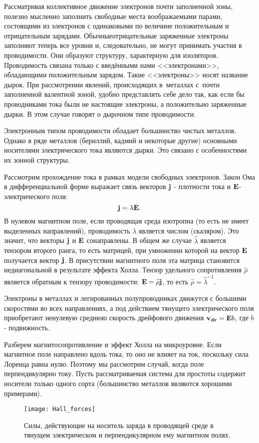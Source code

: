 Рассматривая коллективное движение электронов почти заполненной зоны, полезно мысленно заполнить свободные места
воображаемыми парами, состоящими из электронов с одинаковыми по величине положительным и отрицательным зарядами. Обычныеотрицательные заряженные электроны заполняют теперь все уровни и, следовательно, не могут принимать участия в проводимости. Они образуют структуру, характерную для изоляторов. Проводимость связана только с введёнными нами
<<электронами>>, обладающими положительным зарядом. Такие <<электроны>> носят название \textsf{дырок}. При рассмотрении явлений, происходящих в~металлах с~почти заполненной валентной зоной, удобно представлять себе дело так, как если бы проводниками тока были не настоящие электроны, а положительно заряженные дырки. В этом случае говорят о \textsf{дырочном типе проводимости}.

Электронным типом проводимости обладает большинство чистых металлов. Однако в ряде металлов (бериллий, кадмий и
некоторые другие) основными носителями электрического тока являются дырки. Это связано с особенностями их зонной
структуры.

Рассмотрим прохождение тока в рамках модели свободных электронов.
Закон Ома в дифференциальной форме выражает связь векторов ${\bf j}$ - плотности тока и ${\bf E}$- электрического поля:
\begin{equation}
{\bf j}=\lambda {\bf E}.
\end{equation}
 В нулевом магнитном поле, если проводящая среда изотропна (то есть не имеет выделенных направлений), проводимость $\lambda$ является числом (скаляром). Это значит, что векторы ${\bf j}$ и ${\bf E}$ сонаправлены. В общем же случае $\widehat{\lambda}$ является тензором второго ранга, то есть матрицей, при умножении которой на вектор ${\bf E}$ получается вектор ${\bf j}$. В присутствии магнитного поля эта матрица становится недиагональной в результате эффекта Холла. Тензор удельного сопротивления $\widehat{\rho}$ является обратным к тензору проводимости: ${\bf E}=\widehat{\rho} {\bf j}$, то есть $\widehat{\rho}=\widehat{\lambda}^{-1}$.

Электроны в металлах и легированных полупроводниках движутся с большими скоростями во всех направлениях, а под действием тянущего
электрического поля приобретают ненулевую среднюю скорость дрейфового движения ${\bf v_{dr}}= {\bf E}b$, где $b$ - подвижность.

Разберем магнитосопротивление и эффект Холла на микроуровне. Если магнитное поле направлено вдоль тока, то
оно не влияет на ток, поскольку сила Лоренца равна нулю. Поэтому мы рассмотрим случай, когда поле перпендикулярно
току. Пусть рассматриваемая система для простоты содержит носители только одного сорта (большинство металлов
являются хорошими примерами).
\begin{figure}
	\texttt{[image: Hall\_forces]}
	\caption{Силы, действующие на носитель заряда в проводящей среде в тянущем электрическом и перпендикулярном ему магнитном полях.}
	\label{fig1}
\end{figure}

